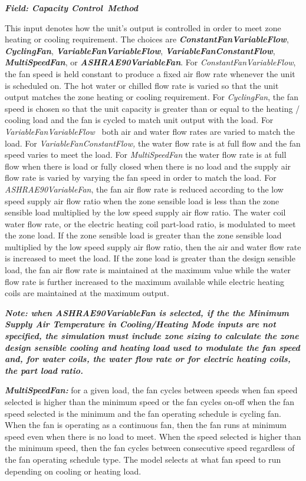 \textbf{\emph{Field: Capacity Control~Method}}

This input denotes how the unit's output is controlled in order to meet zone heating or cooling requirement. The choices are \textbf{\emph{ConstantFanVariableFlow}}, \textbf{\emph{CyclingFan}}, \textbf{\emph{VariableFanVariableFlow}}, \textbf{\emph{VariableFanConstantFlow}}, \textbf{\emph{MultiSpeedFan}}, or \textbf{\emph{ASHRAE90VariableFan}}. For \emph{ConstantFanVariableFlow}, the fan speed is held constant to produce a fixed air flow rate whenever the unit is scheduled on. The hot water or chilled flow rate is varied so that the unit output matches the zone heating or cooling requirement. For \emph{CyclingFan}, the fan speed is chosen so that the unit capacity is greater than or equal to the heating / cooling load and the fan is cycled to match unit output with the load. For \emph{VariableFanVariableFlow} ~both air and water flow rates are varied to match the load. For \emph{VariableFanConstantFlow,} the water flow rate is at full flow and the fan speed varies to meet the load. For \emph{MultiSpeedFan} the water flow rate is at full flow when there is load or fully closed when there is no load and the supply air flow rate is varied by varying the fan speed in order to match the load. For \emph{ASHRAE90VariableFan}, the fan air flow rate is reduced according to the low speed supply air flow ratio when the zone sensible load is less than the zone sensible load multiplied by the low speed supply air flow ratio. The water coil water flow rate, or the electric heating coil part-load ratio, is modulated to meet the zone load. If the zone sensible load is greater than the zone sensible load multiplied by the low speed supply air flow ratio, then the air and water flow rate is increased to meet the load. If the zone load is greater than the design sensible load, the fan air flow rate is maintained at the maximum value while the water flow rate is further increased to the maximum available while electric heating coils are maintained at the maximum output.

\textbf{\emph{Note: when ASHRAE90VariableFan is selected, if the the Minimum Supply Air Temperature in Cooling/Heating Mode inputs are not specified, the simulation must include zone sizing to calculate the zone design sensible cooling and heating load used to modulate the fan speed and, for water coils, the water flow rate or for electric heating coils, the part load ratio.}}

\textbf{\emph{MultiSpeedFan:}} for a given load, the fan cycles between speeds when fan speed selected is higher than the minimum speed or the fan cycles on-off when the fan speed selected is the minimum and the fan operating schedule is cycling fan. When the fan is operating as a continuous fan, then the fan runs at minimum speed even when there is no load to meet. When the speed selected is higher than the minimum speed, then the fan cycles between consecutive speed regardless of the fan operating schedule type. The model selects at what fan speed to run depending on cooling or heating load.


